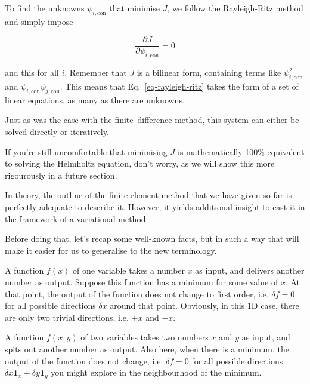 To find the unknowns $\psi_{i,\mathrm{con}}$ that minimise $J$, we follow the Rayleigh-Ritz method and simply impose

\begin{equation}
\frac{\partial J}{\partial \psi_{i,\mathrm{con}}} = 0 \label{eq-rayleigh-ritz}
\end{equation} 

and this for all $i$. Remember that $J$ is a bilinear form, containing terms like $\psi_{i,\mathrm{con}}^2$ and $\psi_{i,\mathrm{con}}\psi_{j,\mathrm{con}}$. This means that Eq.~\ref{eq-rayleigh-ritz} takes the form of a set of linear equations, as many as there are unknowns. 

Just as was the case with the finite--difference method, this system can either be solved directly or iteratively.

If you're still uncomfortable that minimising $J$ is mathematically 100\% equivalent to solving the Helmholtz equation, don't worry, as we will show this more rigourously in a future section.

\pagebreak


In theory, the outline of the finite element method that we have given so far is perfectly adequate to describe it. However, it yields additional insight to cast it in the framework of a variational method.

Before doing that, let's recap some well-known facts, but in such a way that will make it easier for us to generalise to the new terminology.

A function $f(x)$ of one variable takes a number $x$ as input, and delivers another number as output. Suppose this function has a minimum for some value of $x$. At that point, the output of the function does not change to first order, i.e. $\delta f=0$ for all possible directions $\delta x$ around that point. Obviously, in this 1D case, there are only two trivial directions, i.e. $+x$ and $-x$.

A function $f(x,y)$ of two variables takes two numbers $x$ and $y$ as input, and spits out another number as output. Also here, when there is a minimum, the output of the function does not change, i.e. $\delta f=0$ for all possible directions  $\delta x \mathbf{1}_x  + \delta y\mathbf{1}_y$ you might explore in the neighbourhood of the minimum.

